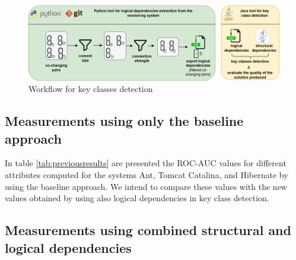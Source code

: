 \documentclass[12pt, a4paper, twoside]{report}
\begin{document}
\begin{figure}[H]
\centering
\includegraphics[width=\textwidth]{key_class_workflow.png}
\caption{Workflow for key classes detection}
\label{fig:workflow_key}
\centering
\end{figure}


\subsection{Measurements using only the baseline approach}


In table \ref{tab:previousresults} are presented the ROC-AUC values for different attributes computed for the systems Ant, Tomcat Catalina, and Hibernate by using the baseline approach. We intend to compare these values with the new values obtained by using also logical dependencies in key class detection.

\begin{table}[!h]
\renewcommand{\arraystretch}{1}
\caption{ROC-AUC metric values extracted. }
\label{tab:previousresults}
\centering
{}
\end{table}





\subsection{Measurements using combined structural and logical dependencies}
\end{document}
